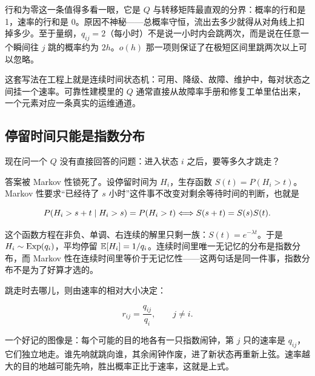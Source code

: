 行和为零这一条值得多看一眼，它是 \(Q\) 与转移矩阵最直观的分界：概率的行和是 1，速率的行和是 0。原因不神秘——总概率守恒，流出去多少就得从对角线上扣掉多少。至于量纲，\(q_{ij}=2\)（每小时）不是说一小时内会跳两次，而是说在任意一个瞬间往 \(j\) 跳的概率约为 \(2h\)。\(o(h)\) 那一项则保证了在极短区间里跳两次以上可以忽略。

这套写法在工程上就是连续时间状态机：可用、降级、故障、维护中，每对状态之间挂一个速率。可靠性建模里的 \(Q\) 通常直接从故障率手册和修复工单里估出来，一个元素对应一条真实的运维通道。

\subsection{停留时间只能是指数分布}

现在问一个 \(Q\) 没有直接回答的问题：进入状态 \(i\) 之后，要等多久才跳走？

答案被 Markov 性锁死了。设停留时间为 \(H_i\)，生存函数 \(S(t)=P(H_i>t)\)。Markov 性要求``已经待了 \(s\) 小时''这件事不改变对剩余等待时间的判断，也就是

\[
P(H_i>s+t\mid H_i>s)=P(H_i>t)
\space\Longleftrightarrow\space
S(s+t)=S(s)S(t).
\]

这个函数方程在非负、单调、右连续的解里只剩一族：\(S(t)=e^{-\lambda t}\)。于是 \(H_i\sim\operatorname{Exp}(q_i)\)，平均停留 \(\mathbb{E}[H_i]=1/q_i\)。连续时间里唯一无记忆的分布是指数分布，而 Markov 性在连续时间里等价于无记忆性——这两句话是同一件事，指数分布不是为了好算才选的。

跳走时去哪儿，则由速率的相对大小决定：

\[
r_{ij}=\frac{q_{ij}}{q_i},\qquad j\ne i.
\]

一个好记的图像是：每个可能的目的地各有一只指数闹钟，第 \(j\) 只的速率是 \(q_{ij}\)，它们独立地走。谁先响就跳向谁，其余闹钟作废，进了新状态再重新上弦。速率越大的目的地越可能先响，胜出概率正比于速率，这就是上式。

